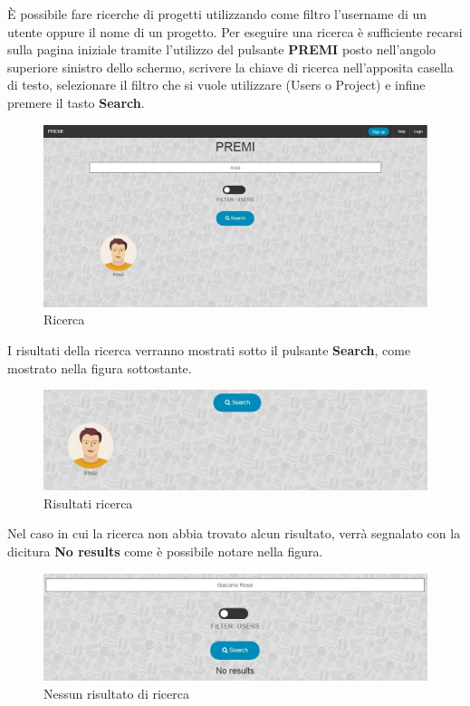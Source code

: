 È possibile fare ricerche di progetti utilizzando come filtro l'username di un utente oppure il nome di un progetto.
\newline
Per eseguire una ricerca è sufficiente recarsi sulla pagina iniziale tramite l'utilizzo del pulsante \textbf{PREMI} posto nell'angolo superiore sinistro dello schermo, scrivere la chiave di ricerca nell'apposita casella di testo, selezionare il filtro che si vuole utilizzare (Users o Project) e infine premere il tasto \textbf{Search}.

\begin{figure}[h] 
	\centering 
	\includegraphics[scale=0.40] {img/ricerca}
	\caption{Ricerca} 
\end{figure}


\noindent I risultati della ricerca verranno mostrati sotto il pulsante \textbf{Search}, come mostrato nella figura sottostante.

\begin{figure}[h] 
	\centering 
	\includegraphics[scale=0.40] {img/ricercaris}
	\caption{Risultati ricerca} 
\end{figure}

\noindent Nel caso in cui la ricerca non abbia trovato alcun risultato, verrà segnalato con la dicitura \textbf{No results} come è possibile notare nella figura.

\begin{figure}[H] 
	\centering 
	\includegraphics[scale=0.40] {img/noresults}
	\caption{Nessun risultato di ricerca} 
\end{figure}